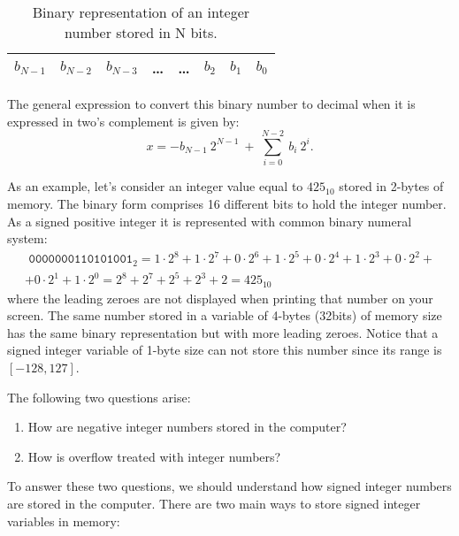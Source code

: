 \begin{table}[h]
    \centering
    \begin{tabular}{| c | c | c | c | c | c | c | c |}
        \hline
        $ b_{N-1} $  & $ b_{N-2} $ &  $ b_{N-3} $ &\ldots  & \ldots & $ b_{2} $  & $ b_{1} $ & $ b_{0} $ \\ \hline 
    \end{tabular}                                                       
    \caption{Binary representation of an integer number stored in N bits.}
    \label{bits}
\end{table}

The general expression to convert this binary number to decimal when it is expressed in two's complement is given by: 
\begin{equation} 
 x = - b_{N-1} \ 2 ^{ N-1 } \ + \ \sum_{i=0} ^{ N-2} \ b_i \ 2^i. 
 \label{reconstruction}
\end{equation} 

As an example, let's consider an integer value equal to $425_{10}$ stored in 2-bytes of memory.
The binary form comprises 16 different bits to hold the integer number. As a signed positive integer 
it is represented with common binary numeral system: 
\begin{multline*}
    \texttt{ 0000000110101001}_{2} = 1\cdot 2^8 +1\cdot 2^7+ 0\cdot 2^6+ 1\cdot 2^5+ 0\cdot 2^4+ 1\cdot 2^3+  0\cdot 2^2+ \\ + 0\cdot 2^1+ 1\cdot 
    2^0 = 2^8 + 2^7 + 2^5 + 2^3 + 2 = 425_{10}
\end{multline*}
where the leading zeroes are not displayed when printing that number on your screen. 
The same number stored in a variable of 4-bytes (32bits) of memory size
has the same binary representation but with more leading zeroes. 
Notice that a signed integer variable of 1-byte size can not store this number 
since its range is  $[-128, 127]$. 




The following two questions arise:
\begin{enumerate} 
\setlength\itemsep{0cm}
\item How are negative integer numbers stored in the computer? 
\item How is overflow treated with integer numbers? 
\end{enumerate} 

To answer these two questions, we should understand how signed integer  
numbers are stored in the computer. 
There are two main ways to store signed integer variables in memory: 

